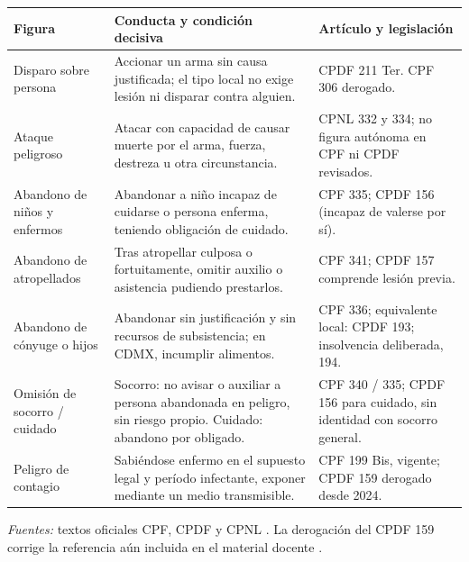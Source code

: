 \documentclass[spanish,letterpaper,oneside]{article}
\begin{document}
\begingroup\fontsize{10.5}{12}\selectfont
\begin{tabularx}{\linewidth}{@{}p{3.1cm}X p{4.15cm}@{}}
\toprule
\textbf{Figura} & \textbf{Conducta y condición decisiva} & \textbf{Artículo y legislación} \\
\midrule
Disparo sobre persona & Accionar un arma sin causa justificada; el tipo local no exige lesión ni disparar contra alguien. & CPDF 211 Ter. CPF 306 derogado. \\
Ataque peligroso & Atacar con capacidad de causar muerte por el arma, fuerza, destreza u otra circunstancia. & CPNL 332 y 334; no figura autónoma en CPF ni CPDF revisados. \\
Abandono de niños y enfermos & Abandonar a niño incapaz de cuidarse o persona enferma, teniendo obligación de cuidado. & CPF 335; CPDF 156 (incapaz de valerse por sí). \\
Abandono de atropellados & Tras atropellar culposa o fortuitamente, omitir auxilio o asistencia pudiendo prestarlos. & CPF 341; CPDF 157 comprende lesión previa. \\
Abandono de cónyuge o hijos & Abandonar sin justificación y sin recursos de subsistencia; en CDMX, incumplir alimentos. & CPF 336; equivalente local: CPDF 193; insolvencia deliberada, 194. \\
Omisión de socorro / cuidado & Socorro: no avisar o auxiliar a persona abandonada en peligro, sin riesgo propio. Cuidado: abandono por obligado. & CPF 340 / 335; CPDF 156 para cuidado, sin identidad con socorro general. \\
Peligro de contagio & Sabiéndose enfermo en el supuesto legal y período infectante, exponer mediante un medio transmisible. & CPF 199 Bis, vigente; CPDF 159 derogado desde 2024. \\
\bottomrule
\end{tabularx}
\par\vspace{2pt}\textit{Fuentes:} textos oficiales CPF, CPDF y CPNL \citep{cpfS4Vigente,cpdfS4Vigente,cpnlS4Vigente}. La derogación del CPDF 159 corrige la referencia aún incluida en el material docente \citep[p.~8]{unadmPenalS4Material}.
\endgroup
\end{document}
